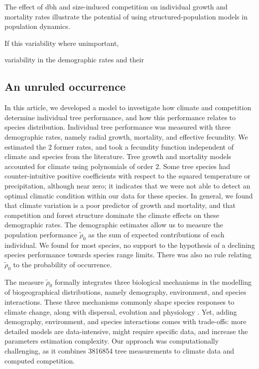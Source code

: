 The effect of dbh and size-induced competition on individual growth and mortality rates illustrate the potential of using structured-population models in population dynamics.


If this variability where unimportant,

variability in the demographic rates and their



\subsection{An unruled occurrence}

In this article, we developed a model to investigate how climate and
competition determine individual tree performance, and how this performance
relates to species distribution. Individual tree performance was measured with
three demographic rates, namely radial growth, mortality, and effective
fecundity. We estimated the 2 former rates, and took a fecundity function independent of climate and species from the
literature. Tree growth and mortality models accounted for climate using
polynomials of order 2. Some tree species had counter-intuitive positive
coefficients with respect to the squared temperature or precipitation,
although near zero; it indicates that we were not able to detect an optimal
climatic condition within our data for these species. In general, we found that climate
variation is a poor predictor of growth and mortality, and that competition
and forest structure dominate the climate effects on these demographic rates.
The demographic estimates allow us to measure the population performance $
\tilde \rho_0 $ as the sum of expected contributions of each individual. We
found for most species, no support to the hypothesis of a declining species
performance towards species range limits. There was also no rule relating $
\tilde \rho_0 $ to the probability of occurrence.

The measure $ \tilde \rho_0
$ formally integrates three biological mechanisms in the modelling of
biogeographical distributions, namely demography, environment, and species
interactions. These three mechanisms commonly shape species responses to
climate change, along with dispersal, evolution and physiology
\citep{Urban2016}. Yet, adding demography, environment, and species
interactions comes with trade-offs: more detailed models are data-intensive,
might require specific data, and increase the parameters estimation
complexity. Our approach was computationally challenging, as it combines
\num{3816854} tree measurements to climate data and computed competition. \\

